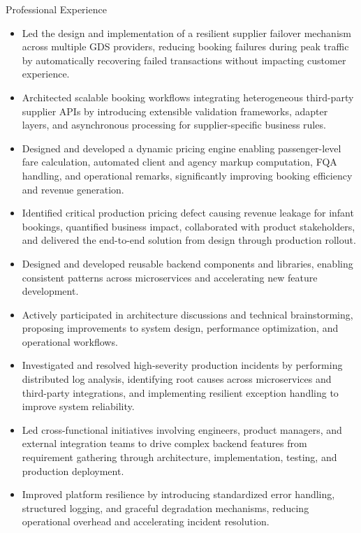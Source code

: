 \documentclass{resume}
\begin{document}
\begin{experienceSection}{Professional Experience}
    \experienceItem[
      company = {JP Morgan Chase \& Company},
      location = {Pune, India},
      roles = {
        \textbf{Software Engineer II} & 2025--Present \\
        \textbf{Software Engineer I} & 2022--2025
      }
    ]
    \begin{itemize}
        \itemsep -6pt {}
        \item Led the design and implementation of a resilient supplier failover mechanism across multiple GDS providers, reducing booking failures during peak traffic by automatically recovering failed transactions without impacting customer experience.
        \item Architected scalable booking workflows integrating heterogeneous third-party supplier APIs by introducing extensible validation frameworks, adapter layers, and asynchronous processing for supplier-specific business rules.
        \item Designed and developed a dynamic pricing engine enabling passenger-level fare calculation, automated client and agency markup computation, FQA handling, and operational remarks, significantly improving booking efficiency and revenue generation.
        \item Identified critical production pricing defect causing revenue leakage for infant bookings, quantified business impact, collaborated with product stakeholders, and delivered the end-to-end solution from design through production rollout.
        \item Designed and developed reusable backend components and libraries, enabling consistent patterns across microservices and accelerating new feature development.
        \item Actively participated in architecture discussions and technical brainstorming, proposing improvements to system design, performance optimization, and operational workflows.
        \item Investigated and resolved high-severity production incidents by performing distributed log analysis, identifying root causes across microservices and third-party integrations, and implementing resilient exception handling to improve system reliability.
        \item Led cross-functional initiatives involving engineers, product managers, and external integration teams to drive complex backend features from requirement gathering through architecture, implementation, testing, and production deployment.
        \item Improved platform resilience by introducing standardized error handling, structured logging, and graceful degradation mechanisms, reducing operational overhead and accelerating incident resolution.
    \end{itemize}
    \vspace{-5pt}
\end{experienceSection}
\end{document}
